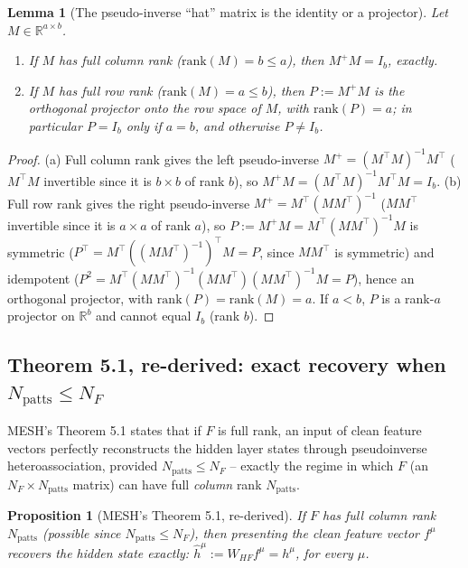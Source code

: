 \documentclass[11pt]{article}
\newtheorem{lemma}{Lemma}
\newtheorem{proposition}{Proposition}
\begin{document}
\begin{lemma}[The pseudo-inverse ``hat'' matrix is the identity or a projector]
\label{lem:pinv-hat}
Let $M\in\mathbb{R}^{a\times b}$.
\begin{enumerate}
\item[(a)] If $M$ has full column rank ($\mathrm{rank}(M)=b\le a$), then $M^+M = I_b$, exactly.
\item[(b)] If $M$ has full row rank ($\mathrm{rank}(M)=a\le b$), then $P:=M^+M$ is the orthogonal
projector onto the row space of $M$, with $\mathrm{rank}(P)=a$; in particular $P=I_b$ only if
$a=b$, and otherwise $P\ne I_b$.
\end{enumerate}
\end{lemma}

\begin{proof}
(a) Full column rank gives the left pseudo-inverse $M^+=(M^\top M)^{-1}M^\top$ ($M^\top M$
invertible since it is $b\times b$ of rank $b$), so $M^+M = (M^\top M)^{-1}M^\top M = I_b$.
(b) Full row rank gives the right pseudo-inverse $M^+=M^\top(MM^\top)^{-1}$ ($MM^\top$ invertible
since it is $a\times a$ of rank $a$), so $P:=M^+M = M^\top(MM^\top)^{-1}M$ is symmetric
($P^\top=M^\top((MM^\top)^{-1})^\top M = P$, since $MM^\top$ is symmetric) and idempotent
($P^2=M^\top(MM^\top)^{-1}(MM^\top)(MM^\top)^{-1}M=P$), hence an orthogonal projector, with
$\mathrm{rank}(P)=\mathrm{rank}(M)=a$. If $a<b$, $P$ is a rank-$a$ projector on
$\mathbb{R}^b$ and cannot equal $I_b$ (rank $b$).
\end{proof}

\subsection{Theorem 5.1, re-derived: exact recovery when $N_{\mathrm{patts}}\le N_F$}

MESH's Theorem 5.1 states that if $F$ is full rank, an input of clean feature vectors perfectly
reconstructs the hidden layer states through pseudoinverse heteroassociation, provided
$N_{\mathrm{patts}}\le N_F$ -- exactly the regime in which $F$ (an $N_F\times N_{\mathrm{patts}}$
matrix) can have full \emph{column} rank $N_{\mathrm{patts}}$.

\begin{proposition}[MESH's Theorem 5.1, re-derived]
\label{prop:mesh-thm51}
If $F$ has full column rank $N_{\mathrm{patts}}$ (possible since $N_{\mathrm{patts}}\le N_F$),
then presenting the clean feature vector $f^\mu$ recovers the hidden state exactly:
$\hat h^\mu := W_{HF}f^\mu = h^\mu$, for every $\mu$.
\end{proposition}
\end{document}
